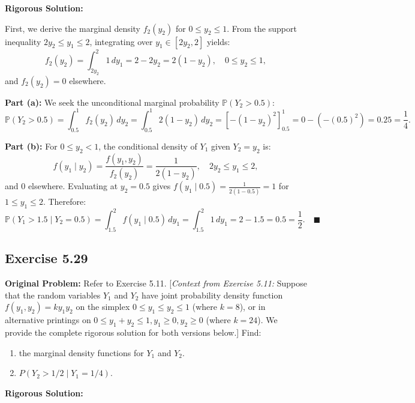 \documentclass[11pt, letterpaper]{article}
\theoremstyle{definition}
\theoremstyle{remark}
\newcommand{\Prob}{\mathbb{P}}
\begin{document}
\textbf{Rigorous Solution:}

First, we derive the marginal density $f_2(y_2)$ for $0 \le y_2 \le 1$. From the support inequality $2y_2 \le y_1 \le 2$, integrating over $y_1 \in [2y_2, 2]$ yields:
\[ f_2(y_2) = \int_{2y_2}^2 1 \, dy_1 = 2 - 2y_2 = 2(1 - y_2), \quad 0 \le y_2 \le 1, \]
and $f_2(y_2) = 0$ elsewhere.

\textbf{Part (a):} We seek the unconditional marginal probability $\Prob(Y_2 > 0.5)$:
\[ \Prob(Y_2 > 0.5) = \int_{0.5}^1 f_2(y_2) \, dy_2 = \int_{0.5}^1 2(1 - y_2) \, dy_2 = \left[ -(1 - y_2)^2 \right]_{0.5}^1 = 0 - (-(0.5)^2) = 0.25 = \frac{1}{4}. \]

\textbf{Part (b):} For $0 \le y_2 < 1$, the conditional density of $Y_1$ given $Y_2 = y_2$ is:
\[ f(y_1 \mid y_2) = \frac{f(y_1, y_2)}{f_2(y_2)} = \frac{1}{2(1 - y_2)}, \quad 2y_2 \le y_1 \le 2, \]
and $0$ elsewhere. Evaluating at $y_2 = 0.5$ gives $f(y_1 \mid 0.5) = \frac{1}{2(1 - 0.5)} = 1$ for $1 \le y_1 \le 2$. Therefore:
\[ \Prob(Y_1 > 1.5 \mid Y_2 = 0.5) = \int_{1.5}^2 f(y_1 \mid 0.5) \, dy_1 = \int_{1.5}^2 1 \, dy_1 = 2 - 1.5 = 0.5 = \frac{1}{2}. \quad \blacksquare \]

\subsection{Exercise 5.29}

\textbf{Original Problem:}
Refer to Exercise 5.11. [\textit{Context from Exercise 5.11:} Suppose that the random variables $Y_1$ and $Y_2$ have joint probability density function $f(y_1, y_2) = k y_1 y_2$ on the simplex $0 \le y_1 \le y_2 \le 1$ (where $k = 8$), or in alternative printings on $0 \le y_1 + y_2 \le 1, y_1 \ge 0, y_2 \ge 0$ (where $k = 24$). We provide the complete rigorous solution for both versions below.] Find:
\begin{enumerate}[label=\textbf{\alph*}]
    \item the marginal density functions for $Y_1$ and $Y_2$.
    \item $P(Y_2 > 1/2 \mid Y_1 = 1/4)$.
\end{enumerate}

\textbf{Rigorous Solution:}
\end{document}
